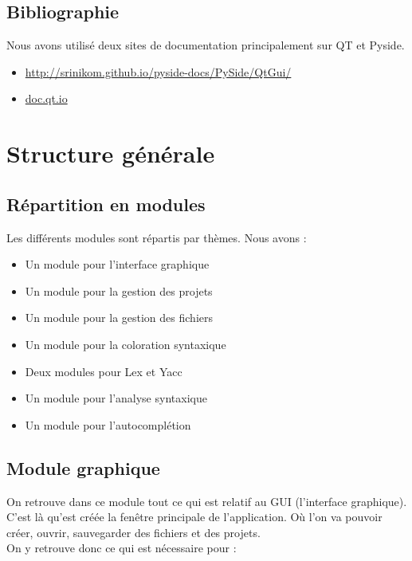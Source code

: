 \documentclass[a4paper,12pt]{article}
\begin{document}
	\subsection{Bibliographie}
	
	Nous avons utilisé deux sites de documentation principalement sur QT et Pyside.
	\begin{itemize}
		\item \url{http://srinikom.github.io/pyside-docs/PySide/QtGui/}
		\item \url{doc.qt.io}
	\end{itemize}
	
\section{Structure générale}

	\subsection{Répartition en modules}
	
		Les différents modules sont répartis par thèmes. Nous avons :
		\begin{itemize}
			\item Un module pour l'interface graphique
			\item Un module pour la gestion des projets
			\item Un module pour la gestion des fichiers
			\item Un module pour la coloration syntaxique
			\item Deux modules pour Lex et Yacc
			\item Un module pour l'analyse syntaxique
			\item Un module pour l'autocomplétion
		\end{itemize}
	
	\subsection{Module graphique}
	
		On retrouve dans ce module tout ce qui est relatif au GUI (l'interface graphique).\\
		C'est là qu'est créée la fenêtre principale de l'application. Où l'on va pouvoir créer, ouvrir, sauvegarder des fichiers et des projets.\\
		
		On y retrouve donc ce qui est nécessaire pour :
		
\end{document}
